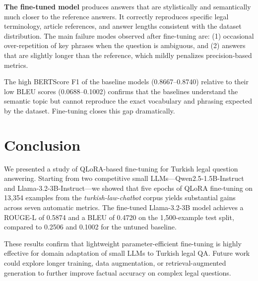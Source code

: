 \documentclass[conference]{IEEEtran}
\begin{document}
\textbf{The fine-tuned model} produces answers that are stylistically and semantically much
closer to the reference answers. It correctly reproduces specific legal terminology, article
references, and answer lengths consistent with the dataset distribution. The main failure
modes observed after fine-tuning are: (1) occasional over-repetition of key phrases when
the question is ambiguous, and (2) answers that are slightly longer than the reference,
which mildly penalizes precision-based metrics.

The high BERTScore F1 of the baseline models (0.8667--0.8740) relative to their low BLEU
scores (0.0688--0.1002) confirms that the baselines understand the semantic topic but
cannot reproduce the exact vocabulary and phrasing expected by the dataset. Fine-tuning
closes this gap dramatically.

\section{Conclusion}

We presented a study of QLoRA-based fine-tuning for Turkish legal question answering.
Starting from two competitive small LLMs---Qwen2.5-1.5B-Instruct and
Llama-3.2-3B-Instruct---we showed that five epochs of QLoRA fine-tuning on 13,354 examples
from the \textit{turkish-law-chatbot} corpus yields substantial gains across seven automatic
metrics. The fine-tuned Llama-3.2-3B model achieves a ROUGE-L of 0.5874 and a BLEU of
0.4720 on the 1,500-example test split, compared to 0.2506 and 0.1002 for the untuned
baseline.

These results confirm that lightweight parameter-efficient fine-tuning is highly effective
for domain adaptation of small LLMs to Turkish legal QA. Future work could explore longer
training, data augmentation, or retrieval-augmented generation to further improve factual
accuracy on complex legal questions.
\end{document}
